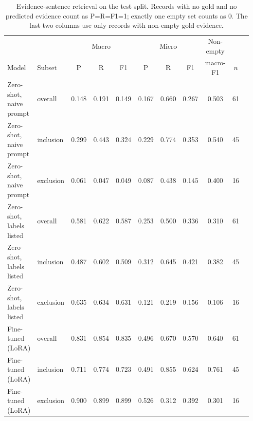 \begin{table}[t]\centering\small
\caption{Evidence-sentence retrieval on the test split. Records with no gold and no predicted evidence count as P=R=F1=1; exactly one empty set counts as 0. The last two columns use only records with non-empty gold evidence.}\label{tab:evidence}
\begin{tabular}{llccccccccc}\toprule
 & & \multicolumn{3}{c}{Macro} & \multicolumn{3}{c}{Micro} & Non-empty & \\
Model & Subset & P & R & F1 & P & R & F1 & macro-F1 & $n$\\\midrule
Zero-shot, naive prompt & overall & 0.148 & 0.191 & 0.149 & 0.167 & 0.660 & 0.267 & 0.503 & 61 \\
Zero-shot, naive prompt & inclusion & 0.299 & 0.443 & 0.324 & 0.229 & 0.774 & 0.353 & 0.540 & 45 \\
Zero-shot, naive prompt & exclusion & 0.061 & 0.047 & 0.049 & 0.087 & 0.438 & 0.145 & 0.400 & 16 \\\midrule
Zero-shot, labels listed & overall & 0.581 & 0.622 & 0.587 & 0.253 & 0.500 & 0.336 & 0.310 & 61 \\
Zero-shot, labels listed & inclusion & 0.487 & 0.602 & 0.509 & 0.312 & 0.645 & 0.421 & 0.382 & 45 \\
Zero-shot, labels listed & exclusion & 0.635 & 0.634 & 0.631 & 0.121 & 0.219 & 0.156 & 0.106 & 16 \\\midrule
Fine-tuned (LoRA) & overall & 0.831 & 0.854 & 0.835 & 0.496 & 0.670 & 0.570 & 0.640 & 61 \\
Fine-tuned (LoRA) & inclusion & 0.711 & 0.774 & 0.723 & 0.491 & 0.855 & 0.624 & 0.761 & 45 \\
Fine-tuned (LoRA) & exclusion & 0.900 & 0.899 & 0.899 & 0.526 & 0.312 & 0.392 & 0.301 & 16 \\\midrule
\bottomrule\end{tabular}\end{table}
